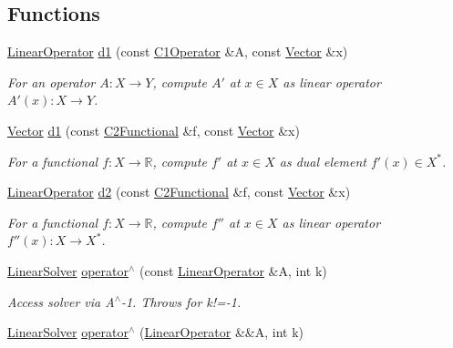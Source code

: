 \subsection*{Functions}
\begin{DoxyCompactItemize}
\item 
\hyperlink{classSpacy_1_1LinearOperator}{Linear\-Operator} \hyperlink{namespaceSpacy_a2205e2a2c4bb5242665bbc09929d35d2}{d1} (const \hyperlink{classSpacy_1_1C1Operator}{C1\-Operator} \&A, const \hyperlink{classSpacy_1_1Vector}{Vector} \&x)
\begin{DoxyCompactList}\small\item\em For an operator $ A: X\to Y $, compute $A'$ at $x\in X$ as linear operator $ A'(x): X \to Y $. \end{DoxyCompactList}\item 
\hyperlink{classSpacy_1_1Vector}{Vector} \hyperlink{namespaceSpacy_ab6646eb7068eb9f1369e639cf0b620a2}{d1} (const \hyperlink{classSpacy_1_1C2Functional}{C2\-Functional} \&f, const \hyperlink{classSpacy_1_1Vector}{Vector} \&x)
\begin{DoxyCompactList}\small\item\em For a functional $ f: X\to \mathbb{R} $, compute $f'$ at $x\in X$ as dual element $ f'(x) \in X^* $. \end{DoxyCompactList}\item 
\hyperlink{classSpacy_1_1LinearOperator}{Linear\-Operator} \hyperlink{namespaceSpacy_a569d8fc0b4a0e292f257dd6307a25c8f}{d2} (const \hyperlink{classSpacy_1_1C2Functional}{C2\-Functional} \&f, const \hyperlink{classSpacy_1_1Vector}{Vector} \&x)
\begin{DoxyCompactList}\small\item\em For a functional $ f: X\to \mathbb{R} $, compute $f''$ at $x\in X$ as linear operator $ f''(x): X \to X^* $. \end{DoxyCompactList}\item 
\hypertarget{namespaceSpacy_ab1be097dacbf27785979de79ed5b3178}{\hyperlink{namespaceSpacy_adcd0d78166a9c972b8a2e5a689fc2d03}{Linear\-Solver} \hyperlink{namespaceSpacy_ab1be097dacbf27785979de79ed5b3178}{operator$^\wedge$} (const \hyperlink{classSpacy_1_1LinearOperator}{Linear\-Operator} \&A, int k)}\label{namespaceSpacy_ab1be097dacbf27785979de79ed5b3178}

\begin{DoxyCompactList}\small\item\em Access solver via A$^\wedge$-\/1. Throws for k!=-\/1. \end{DoxyCompactList}\item 
\hypertarget{namespaceSpacy_a6defec6ee302bf4c1054afc65c9fcb95}{\hyperlink{namespaceSpacy_adcd0d78166a9c972b8a2e5a689fc2d03}{Linear\-Solver} \hyperlink{namespaceSpacy_a6defec6ee302bf4c1054afc65c9fcb95}{operator$^\wedge$} (\hyperlink{classSpacy_1_1LinearOperator}{Linear\-Operator} \&\&A, int k)}\label{namespaceSpacy_a6defec6ee302bf4c1054afc65c9fcb95}


\end{DoxyCompactItemize}
